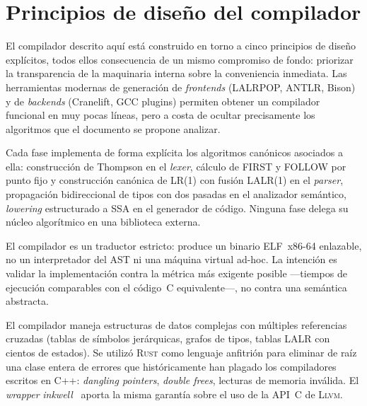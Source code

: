 \documentclass[11pt,a4paper,oneside,openany]{report}
\newcommand{\rust}{\textsc{Rust}}
\newcommand{\llvm}{\textsc{Llvm}}
\newcommand{\inkwell}{\textit{inkwell}}
\begin{document}
\section{Principios de diseño del compilador}

El compilador descrito aquí está construido en torno a cinco principios de diseño
explícitos, todos ellos consecuencia de un mismo compromiso de fondo: priorizar
la transparencia de la maquinaria interna sobre la conveniencia inmediata. Las
herramientas modernas de generación de \textit{frontends} (LALRPOP, ANTLR,
Bison) y de \textit{backends} (Cranelift, GCC plugins) permiten obtener un
compilador funcional en muy pocas líneas, pero a costa de ocultar precisamente
los algoritmos que el documento se propone analizar.

\begin{description}[style=nextline,leftmargin=2.2em]
  \item[D1. Transparencia algorítmica.]
    Cada fase implementa de forma explícita los algoritmos canónicos asociados
    a ella: construcción de Thompson en el \textit{lexer}, cálculo de FIRST y
    FOLLOW por punto fijo y construcción canónica de LR(1) con fusión LALR(1)
    en el \textit{parser}, propagación bidireccional de tipos con dos pasadas
    en el analizador semántico, \textit{lowering} estructurado a SSA en el
    generador de código. Ninguna fase delega su núcleo algorítmico en una
    biblioteca externa.
  \item[D2. Compilación a código nativo, no interpretación.]
    El compilador es un traductor estricto: produce un binario ELF~x86-64
    enlazable, no un interpretador del AST ni una máquina virtual ad-hoc. La
    intención es validar la implementación contra la métrica más exigente
    posible ---tiempos de ejecución comparables con el código~C equivalente---,
    no contra una semántica abstracta.
  \item[D3. Seguridad de memoria del compilador mismo.]
    El compilador maneja estructuras de datos complejas con múltiples
    referencias cruzadas (tablas de símbolos jerárquicas, grafos de tipos,
    tablas LALR con cientos de estados). Se utilizó \rust{} como lenguaje
    anfitrión para eliminar de raíz una clase entera de errores que
    históricamente han plagado los compiladores escritos en C++:
    \textit{dangling pointers}, \textit{double frees}, lecturas de memoria
    inválida. El \textit{wrapper} \inkwell{}~\cite{inkwell} aporta la misma
    garantía sobre el uso de la API~C de \llvm{}.
  \item[D4. Reproducibilidad y \textit{debuggability}.]

\end{description}
\end{document}
